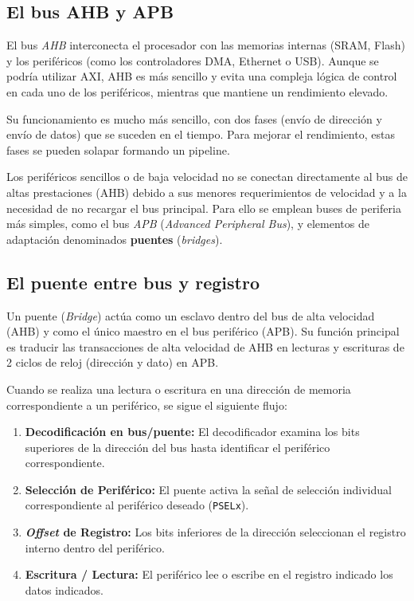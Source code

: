 \documentclass[../main.tex]{subfiles}
\begin{document}
        \subsection{El bus AHB y APB}
            El bus \emph{AHB} interconecta el procesador con las memorias internas (SRAM, Flash) y los periféricos (como los controladores DMA, Ethernet o USB). Aunque se podría utilizar AXI, AHB es más sencillo y evita una compleja lógica de control en cada uno de los periféricos, mientras que mantiene un rendimiento elevado.

            Su funcionamiento es mucho más sencillo, con dos fases (envío de dirección y envío de datos) que se suceden en el tiempo. Para mejorar el rendimiento, estas fases se pueden solapar formando un pipeline.

            Los periféricos sencillos o de baja velocidad no se conectan directamente al bus de altas prestaciones (AHB) debido a sus menores requerimientos de velocidad y a la necesidad de no recargar el bus principal. Para ello se emplean buses de periferia más simples, como el bus \emph{APB} (\emph{Advanced Peripheral Bus}), y elementos de adaptación denominados \textbf{puentes} (\emph{bridges}).

        \subsection{El puente entre bus y registro}

            Un puente (\emph{Bridge}) actúa como un esclavo dentro del bus de alta velocidad (AHB) y como el único maestro en el bus periférico (APB). Su función principal es traducir las transacciones de alta velocidad de AHB en lecturas y escrituras de 2 ciclos de reloj (dirección y dato) en APB.

            Cuando se realiza una lectura o escritura en una dirección de memoria correspondiente a un periférico, se sigue el siguiente flujo:

            \begin{enumerate}
                \item \textbf{Decodificación en bus/puente:} El decodificador examina los bits superiores de la dirección del bus hasta identificar el periférico correspondiente.
                \item \textbf{Selección de Periférico:} El puente activa la señal de selección individual correspondiente al periférico deseado (\texttt{PSELx}).
                \item \textbf{\emph{Offset} de Registro:} Los bits inferiores de la dirección seleccionan el registro interno dentro del periférico.
                \item \textbf{Escritura / Lectura:} El periférico lee o escribe en el registro indicado los datos indicados.
            \end{enumerate}
\end{document}
